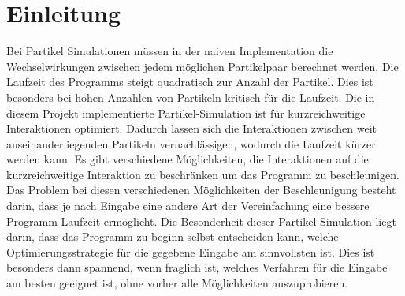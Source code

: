 \documentclass[
12pt,
a4paper,
BCOR10mm,
DIV14,
headsepline,
]{scrreprt}
\begin{document}
	\chapter{Einleitung}%
	\label{Einleitung}
	Bei Partikel Simulationen müssen in der naiven Implementation die Wechselwirkungen zwischen jedem möglichen Partikelpaar berechnet werden. Die Laufzeit des Programms steigt quadratisch zur Anzahl der Partikel. Dies ist besonders bei hohen Anzahlen von Partikeln kritisch für die Laufzeit. Die in diesem Projekt implementierte Partikel-Simulation ist für kurzreichweitige Interaktionen optimiert. Dadurch lassen sich die Interaktionen zwischen weit auseinanderliegenden Partikeln vernachlässigen, wodurch die Laufzeit kürzer werden kann. Es gibt verschiedene Möglichkeiten, die Interaktionen auf die kurzreichweitige Interaktion zu beschränken um das Programm zu beschleunigen. Das Problem bei diesen verschiedenen Möglichkeiten der Beschleunigung besteht darin, dass je nach Eingabe eine andere Art der Vereinfachung eine bessere Programm-Laufzeit ermöglicht. Die Besonderheit dieser Partikel Simulation liegt darin, dass das Programm zu beginn selbst entscheiden kann, welche Optimierungsstrategie für die gegebene Eingabe am sinnvollsten ist. Dies ist besonders dann spannend, wenn fraglich ist, welches Verfahren für die Eingabe am besten geeignet ist, ohne vorher alle Möglichkeiten auszuprobieren.
	
\end{document}

